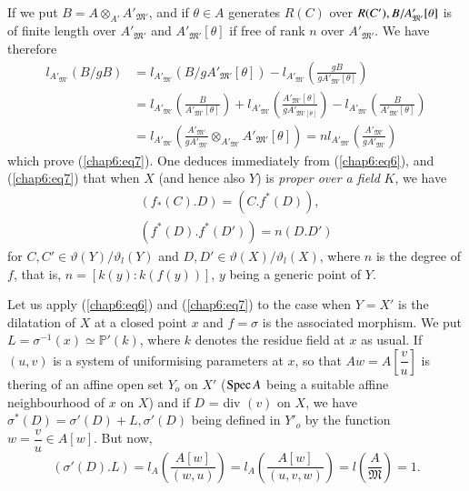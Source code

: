 If we put $B = A \otimes_{A'}A'_{\mathfrak{M}'}$, and if $\theta\in A $
generates $R(C)$ over $R(C'),\break B/A'_{\mathfrak{M}'}[\theta]$ is of finite
length over $A'_{\mathfrak{M}'}$ and $A'_{\mathfrak{M}'}[\theta]$ if
free of rank  $n$ over $A'_{\mathfrak{M}'}$. We have therefore 
\begin{align*}
  l_{A'_{\mathfrak{M}'}}(B/gB) & =
  l_{A'_{\mathfrak{M}'}}(B/gA'_{\mathfrak{M}'}[\theta])
  -l_{A'_{\mathfrak{M}'}} \left(\frac{gB}{gA'_{\mathfrak{M}'}[\theta]}\right)\\ 
  & = l_{A'_{\mathfrak{M}'}}
  \left(\frac{B}{A'_{\mathfrak{M}'}[\theta]}\right) +
  l_{A'_{\mathfrak{M}'}} \left(\frac{A'_{\mathfrak{M}'}[\theta
  ]}{gA'_{\mathfrak{M}'[\theta]}}\right) -l_{A'_{\mathfrak{M}'}}
  \left(\frac{B}{A'_{\mathfrak{M}'}[\theta]} \right)\\
  & = l_{A'_{\mathfrak{M}'}}  \left(\frac{A'_{\mathfrak{M}'}}{gA'_{\mathfrak{M}'}} 
  \otimes_{A'_{\mathfrak{M}'}}A'_{\mathfrak{M}'}[\theta] \right) =
  n l_{A'_{\mathfrak{M}'}} \left(\frac{A'_{\mathfrak{M}'}}{gA'_{\mathfrak{M}'}}\right)
\end{align*}\pageoriginale 
which prove (\ref{chap6:eq7}). One deduces immediately from (\ref{chap6:eq6}),
and (\ref{chap6:eq7}) that when $X$ (and hence also $Y$) is \textit{proper
  over a field} $K$, we have  
\begin{gather*}
  (f_*(C).D) = (C.f^*(D)),\tag{8}\label{chap6:eq8}\\
  (f^*(D).f^*(D')) = n(D.D')
\end{gather*}
for $C,C'\in \vartheta(Y)/\vartheta_l(Y)$ and $D,D'\in
\vartheta(X)/\vartheta_l(X)$, where $n$ is the degree of $f$, that is, $n=
       [k(y):k(f(y))]$, $y$ being a generic point of $Y$. 

Let us apply (\ref{chap6:eq6}) and (\ref{chap6:eq7}) to the case when $Y = X'$ is the
dilatation of $X$ at a closed point $x$ and $f = \sigma$ is the
associated morphism. We put $L = \sigma^{-1}(x)\simeq \mathbb{P}' (k)$,
where $k$ denotes the residue field at $x$ as usual. If $(u,v)$ is a
system of uniformising parameters at $x$, so that $A w =
A\left[\dfrac{v}{u}\right]$ is the\pageoriginale  ring of an affine
open set $Y_o$ on 
$X'$ ($\operatorname{Spec} A$ being a suitable affine neighbourhood of $x$ on $X$)
and if $D$ = div $(v)$ on $X$, we have $\sigma^*(D) = \sigma'(D) +
L,\sigma'(D)$ being defined in $Y'_o$ by the function $w =
\dfrac{v}{u}\in A[w]$. But now,
$$
(\sigma'(D).L) = l_A
\left(\frac{A[w]}{(w,u)}\right) = l_A \left(\frac{A[w]}{(u,v,w)}\right) =
l \left(\frac{A}{\mathfrak{M}}\right) = 1.
$$ 


